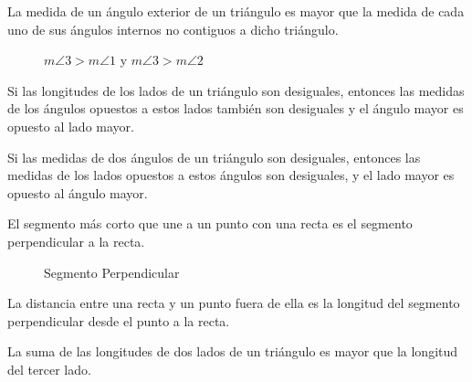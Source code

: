 \begin{theorem}
La medida de un ángulo exterior de un triángulo es mayor que la medida de cada uno de sus ángulos internos no contiguos a dicho triángulo.

    \begin{figure}[!h]
        \centering
        
        \caption{$m\angle{3} > m\angle{1}$ y $m\angle{3} > m\angle{2}$}
        \label{fig:ang-int-ext-diff}
    \end{figure}

\end{theorem}

\begin{theorem}
    Si las longitudes de los lados de un triángulo son desiguales, entonces las medidas de los ángulos opuestos a estos lados también son desiguales y el ángulo mayor es opuesto al lado mayor.

\end{theorem}

\begin{theorem}
    Si las medidas de dos ángulos de un triángulo son desiguales, entonces las medidas de los lados opuestos a estos ángulos son desiguales, y el lado mayor es opuesto al ángulo mayor.
\end{theorem}

\clearpage

\begin{theorem}
    El segmento más corto que une a un punto con una recta es el segmento perpendicular a la recta.

    \begin{figure}[!h]
        \centering
        
        \caption{Segmento Perpendicular}
        \label{fig:segmento-perpendicular}
    \end{figure}
    
\end{theorem}

\begin{definition}
    La distancia entre una recta y un punto fuera de ella es la longitud del segmento perpendicular desde el punto a la recta.
\end{definition}

\begin{theorem}
    La suma de las longitudes de dos lados de un triángulo es mayor que la longitud del tercer lado.
\end{theorem}

